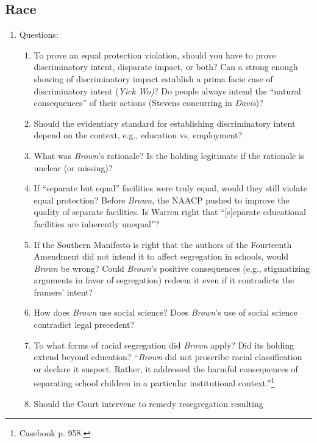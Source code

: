 \subsection{Race}

\begin{enumerate}
    \item Questions:
    \begin{enumerate}
        \item To prove an equal protection violation, should you have to prove 
        discriminatory intent, disparate impact, or both? Can a strong enough 
        showing of discriminatory impact establish a prima facie case of 
        discriminatory intent (\emph{Yick Wo)}? Do people always intend the 
        ``natural consequences'' of their actions (Stevens concurring in 
        \emph{Davis})?
        \item Should the evidentiary standard for establishing discriminatory 
        intent depend on the context, e.g., education vs. employment?
        \item What was \emph{Brown}'s rationale? Is the holding legitimate 
        if the rationale is unclear (or missing)?
        \item If ``separate but equal'' facilities were truly equal, would 
        they still violate equal protection? Before \emph{Brown}, the NAACP 
        pushed to improve the quality of separate facilities. Is Warren right 
        that ``[s]eparate educational facilities are inherently unequal''?
        \item If the Southern Manifesto is right that the authors of the 
        Fourteenth Amendment did not intend it to affect segregation in 
        schools, would \emph{Brown} be wrong? Could \emph{Brown}'s positive 
        consequences (e.g., stigmatizing arguments in favor of segregation) 
        redeem it even if it contradicts the framers' intent?
        \item How does \emph{Brown} use social science? Does \emph{Brown}'s 
        use of social science contradict legal precedent?
        \item To what forms of racial segregation did \emph{Brown} apply? Did 
        its holding extend beyond education? ``\emph{Brown} did not proscribe 
        racial classification or declare it suspect. Rather, it 
        addressed the harmful consequences of separating school children in a 
        particular institutional context.''\footnote{Casebook p. 958.}
        \item Should the Court intervene to remedy resegregation resulting 

\end{enumerate}
\end{enumerate}
